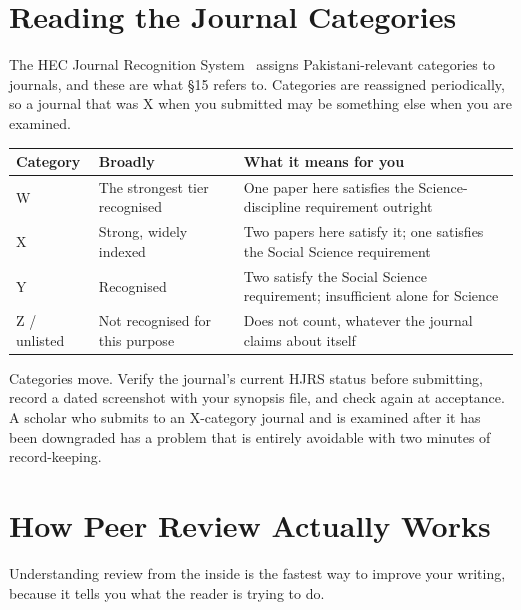\section{Reading the Journal Categories}

The HEC Journal Recognition System~\cite{hec2024hjrs} assigns Pakistani-relevant
categories to journals, and these are what \S15 refers to. Categories are
reassigned periodically, so a journal that was X when you submitted may be
something else when you are examined.

\begin{center}
\small
\begin{tabular}{@{}L{1.6cm}L{5.4cm}L{7.5cm}@{}}
\toprule
\textbf{Category} & \textbf{Broadly} & \textbf{What it means for you} \\
\midrule
W & The strongest tier recognised
  & One paper here satisfies the Science-discipline requirement outright \\
X & Strong, widely indexed
  & Two papers here satisfy it; one satisfies the Social Science requirement \\
Y & Recognised
  & Two satisfy the Social Science requirement; insufficient alone for Science \\
Z / unlisted & Not recognised for this purpose
  & Does not count, whatever the journal claims about itself \\
\bottomrule
\end{tabular}
\end{center}

\begin{pitfall}
Categories move. Verify the journal's current HJRS status before submitting,
record a dated screenshot with your synopsis file, and check again at
acceptance. A scholar who submits to an X-category journal and is examined
after it has been downgraded has a problem that is entirely avoidable with two
minutes of record-keeping.
\end{pitfall}

\section{How Peer Review Actually Works}

Understanding review from the inside is the fastest way to improve your
writing, because it tells you what the reader is trying to do.

